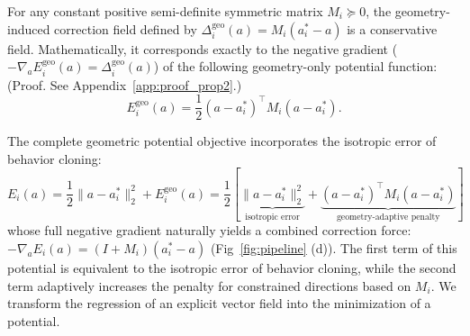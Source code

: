 \begin{proposition}
    \label{prop:geometry_induced_potential}
    For any constant positive semi-definite symmetric matrix \(M_i \succeq 0\), the geometry-induced correction field defined by \(\Delta_i^{\text{geo}}(a) = M_i(a_i^* - a)\) is a conservative field. Mathematically, it corresponds exactly to the negative gradient (\(-\nabla_a E_i^{\text{geo}}(a) = \Delta_i^{\text{geo}}(a)\)) of the following geometry-only potential function:
    (Proof. See Appendix~\ref{app:proof_prop2}.)
    \begin{equation}
        E_i^{\text{geo}}(a) = \frac{1}{2} (a - a_i^*)^\top M_i (a - a_i^*).
    \end{equation}
\end{proposition}
The complete geometric potential objective incorporates the isotropic error of behavior cloning:
\begin{equation}
    E_i(a) = \frac{1}{2} \| a - a_i^* \|_2^2 + E_i^{\text{geo}}(a) = \frac{1}{2}[\underbrace{ \| a - a_i^* \|_2^2}_{\text{isotropic error}} + \underbrace{(a - a_i^*)^\top M_i (a - a_i^*)}_{\text{geometry-adaptive penalty}}]
\end{equation}
whose full negative gradient naturally yields a combined correction force: \(-\nabla_a E_i(a) = (I + M_i)(a_i^* - a)\) (Fig~\ref{fig:pipeline} (d)).
The first term of this potential is equivalent to the isotropic error of behavior cloning, 
while the second term adaptively increases the penalty for constrained directions based on \(M_i\). 
We transform the regression of an explicit vector field into the minimization of a potential. 

